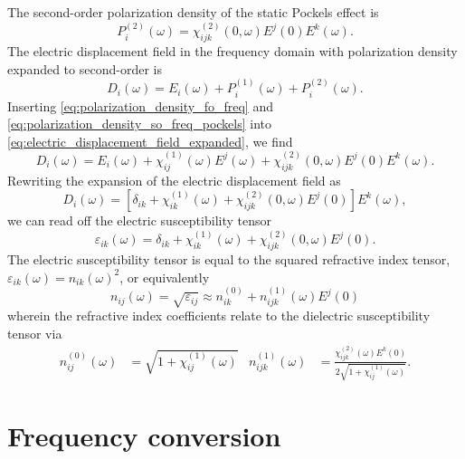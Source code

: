 The second-order polarization density of the static Pockels effect is~\cite[p.~495]{Boyd2020}
\begin{equation}
	P_i^{(2)}(\omega)
	=
	\chi^{(2)}_{ijk}(0,\omega)
	E^j(0)
	E^k(\omega)
	.
	\label{eq:polarization_density_so_freq_pockels}
\end{equation}
The electric displacement field in the frequency domain with polarization density expanded to second-order is~\cite[p.~1070]{Mandel1995}
\begin{equation}
	D_i(\omega)
	=
	E_i(\omega)
	+
	P_i^{(1)}(\omega)
	+
	P_i^{(2)}(\omega)
	.
	\label{eq:electric_displacement_field_expanded}
\end{equation}
Inserting \cref{eq:polarization_density_fo_freq} and \cref{eq:polarization_density_so_freq_pockels} into \cref{eq:electric_displacement_field_expanded}, we find
\begin{equation}
	D_i(\omega)
	=
	E_i(\omega)
	+
	\chi^{(1)}_{ij}(\omega)
	E^j(\omega)
	+
	\chi^{(2)}_{ijk}(0,\omega)
	E^j(0)
	E^k(\omega)
	.
\end{equation}
Rewriting the expansion of the electric displacement field as
\begin{equation}
	D_i(\omega)
	=
	\left[
		\delta_{ik}
		+
		\chi^{(1)}_{ik}(\omega)
		+
		\chi^{(2)}_{ijk}(0,\omega)
		E^j(0)
	\right]
	E^k(\omega)
	,
\end{equation}
we can read off the electric susceptibility tensor
\begin{equation}
	\varepsilon_{ik}(\omega)
	=
	\delta_{ik}
	+
	\chi^{(1)}_{ik}(\omega)
	+
	\chi^{(2)}_{ijk}(0,\omega)
	E^j(0)
	.
\end{equation}
The electric susceptibility tensor is equal to the squared refractive index tensor, $\varepsilon_{ik}(\omega)=n_{ik}(\omega)^2$, or equivalently~\cite[p.~3]{Brooker2003}
\begin{equation}
	n_{ij}(\omega)
	=
	\sqrt{\varepsilon_{ij}}
	\approx
	n_{ik}^{(0)}
	+
	n_{ijk}^{(1)}(\omega)
	E^j(0)
\end{equation}
wherein the refractive index coefficients relate to the dielectric susceptibility tensor via~\cite{Rerat2020}
\begin{align}
	n^{(0)}_{ij}(\omega)
	&=
	\sqrt{1+\chi^{(1)}_{ij}(\omega)}
	&
	n^{(1)}_{ijk}(\omega)
	&=
	\frac{\chi^{(2)}_{ijk}(\omega)
	E^k(0)}{2\sqrt{1+\chi^{(1)}_{ij}(\omega)}}
	.
\end{align}

\section{Frequency conversion}

